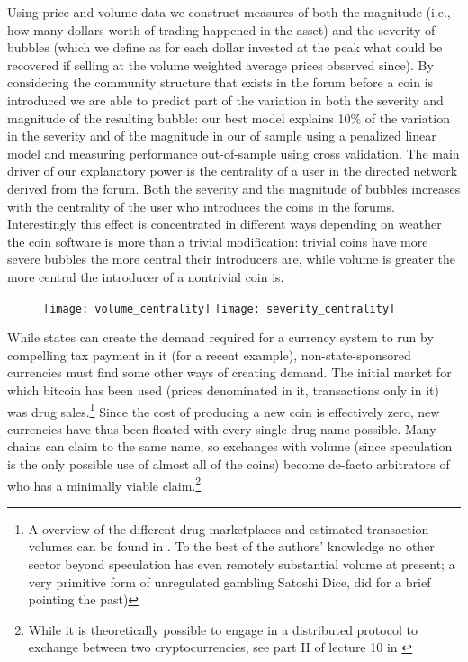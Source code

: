 Using price and volume data we construct measures of both the magnitude (i.e., how many dollars worth of trading happened in the asset) and the severity of bubbles
(which we define as for each dollar invested at the peak what could be recovered if selling at the volume weighted average prices observed since).
By considering the community structure that exists in the forum before a coin is introduced we are able to predict part of the variation in both the severity and magnitude of the resulting bubble: our best model explains 10\% of the variation in the severity and of the magnitude in our of sample using a penalized linear model and measuring performance out-of-sample using cross validation.
The main driver of our explanatory power is the centrality of a user in the directed network derived from the forum.
Both the severity and the magnitude of bubbles increases with the centrality of the user who introduces the coins in the forums.	
Interestingly this effect is concentrated in different ways depending on weather the coin software is more than a trivial modification: trivial coins have more severe bubbles the more central their introducers are, while volume is greater the more central the introducer of a nontrivial coin is.


\begin{figure}
\texttt{[image: volume\_centrality]}
\texttt{[image: severity\_centrality]}
\end{figure}

While states can create the demand required for a currency system to run by compelling tax payment in it (for a recent example), non-state-sponsored currencies must find some other ways of creating demand.
The initial market for which bitcoin has been used (prices denominated in it, transactions only in it) was drug sales.\footnote{A overview of the different drug marketplaces and estimated transaction volumes can be found in \cite{soska2015measuring}. To the best of the authors' knowledge no other sector beyond speculation has even remotely substantial volume at present; a very primitive form of unregulated gambling Satoshi Dice, did for a brief pointing the past)
}
Since the cost of producing a new coin is effectively zero, new currencies have thus been floated with every single drug name possible. Many chains can claim to the same name, so exchanges with volume (since speculation is the only possible use of almost all of the coins) become de-facto arbitrators of who has a minimally viable claim.\footnote{While it is theoretically possible to engage in a distributed protocol to exchange between two cryptocurrencies, see part II of lecture 10 in \cite{princeton10}}

